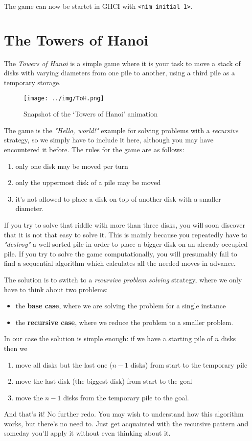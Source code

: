 The game can now be startet in GHCI with \texttt{<nim initial 1>}.

\section{The Towers of Hanoi}

The \emph{Towers of Hanoi} is a simple game where it is your task to move a stack of disks with varying diameters from one pile to another, using a third pile as a temporary storage.

\begin{figure}[ht]
\centering
\texttt{[image: ../img/ToH.png]}
\caption[Towers of Hanoi]{Snapshot of the `Towers of Hanoi' animation}
\end{figure}

The game is the \emph{"Hello, world!"} example for solving problems with a \emph{recursive} strategy, so we simply have to include it here, although you may have encountered it before.
The rules for the game are as follows:
\begin{enumerate}
\item only one disk may be moved per turn
\item only the uppermost disk of a pile may be moved
\item it's not allowed to place a disk on top of another disk with a smaller diameter.
\end{enumerate}
If you try to solve that riddle with more than three disks, you will soon discover that it is not that easy to solve it.
This is mainly because you repeatedly have to \emph{"destroy"} a well-sorted pile in order to place a bigger disk on an already occupied pile.
If you try to solve the game computationally, you will presumably fail to find a sequential algorithm which calculates all the needed moves in advance.

The solution is to switch to a \emph{recursive problem solving} strategy, where we only have to think about two problems:
\begin{itemize}
\item the \textbf{base case}, where we are solving the problem for a single instance
\item the \textbf{recursive case}, where we reduce the problem to a smaller problem.
\end{itemize}
In our case the solution is simple enough: if we have a starting pile of $n$ disks then we
\begin{enumerate}
\item move all disks but the last one ($n-1$ disks) from start to the temporary pile
\item move the last disk (the biggest disk) from start to the goal
\item move the $n-1$ disks from the temporary pile to the goal.
\end{enumerate}
And that's it! No further redo.
You may wish to understand how this algorithm works, but there's no need to. Just get acquainted with the recursive pattern and someday you'll apply it without even thinking about it.

